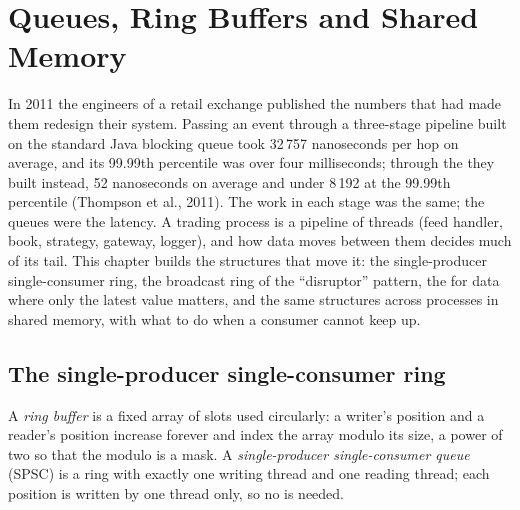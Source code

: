 \chapter{Queues, Ring Buffers and Shared Memory}\label{ch:ll:queues-ring-buffers-and-shared-memory}

In 2011 the engineers of a retail exchange published the numbers that had made them redesign their system. Passing an
event through a three-stage pipeline built on the standard Java blocking queue took 32\,757 nanoseconds per hop on
average, and its 99.99th percentile was over four milliseconds; through the  they built instead, 52
nanoseconds on average and under 8\,192 at the 99.99th percentile (Thompson et al., 2011). The work in each stage was
the same; the queues were the latency. A trading process is a pipeline of threads (feed handler, book, strategy, gateway,
logger), and how data moves between them decides much of its tail. This chapter builds the structures that move it: the
single-producer single-consumer ring, the broadcast ring of the ``disruptor'' pattern, the  for data where
only the latest value matters, and the same structures across processes in shared memory, with what to do when a
consumer cannot keep up.

\section{The single-producer single-consumer ring}

\begin{definition}\label{def:ll:queues-ring-buffers-and-shared-memory:ring}
A \emph{ring buffer} is a fixed array of slots used circularly: a writer's position and a reader's position
increase forever and index the array modulo its size, a power of two so that the modulo is a mask. A \emph{single-producer
single-consumer queue} (SPSC) is a ring with exactly one writing thread and one
reading thread; each position is written by one thread only, so no  is needed.
\end{definition}

